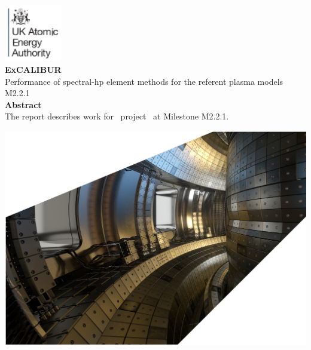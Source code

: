 \documentclass[11pt,twoside,a4paper]{article}
\newcommand{\culhamtitle}{\LARGE Performance of spectral-hp element methods for the referent plasma models  \\[1.0\baselineskip] M2.2.1 }%
\begin{document}
\begin{titlepage}
\includegraphics[width=2.5cm]{../corpics/cofaplus} \\[2.0\baselineskip]
{\LARGE {\textbf{\textsf{ExCALIBUR}}}}\\[2.0\baselineskip]
{\LARGE \culhamtitle } \\[2.0\baselineskip]
{\textbf{\textsf{Abstract}}}\\
The report describes work for \exc \ project \nep \
at Milestone M2.2.1.

\vfill
\hspace{-20mm}\includegraphics[width=22.0cm]{../corpics/tokintcrop}
\end{titlepage}

\clearpage
%
\end{document}
